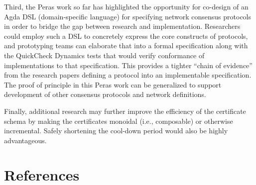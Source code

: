 \documentclass[10pt]{article}
\begin{document}
Third, the Peras work so far has highlighted the opportunity for
co-design of an Agda DSL (domain-specific language) for specifying
network consensus protocols in order to bridge the gap between research
and implementation. Researchers could employ such a DSL to concretely
express the core constructs of protocols, and prototyping teams can
elaborate that into a formal specification along with the QuickCheck
Dynamics tests that would verify conformance of implementations to that
specification. This provides a tighter ``chain of evidence'' from the
research papers defining a protocol into an implementable specification.
The proof of principle in this Peras work can be generalized to support
development of other consensus protocols and network definitions.

Finally, additional research may further improve the efficiency of the
certificate schema by making the certificates monoidal (i.e.,
composable) or otherwise incremental. Safely shortening the cool-down
period would also be highly advantageous.

\section{References}\label{references}
\end{document}

